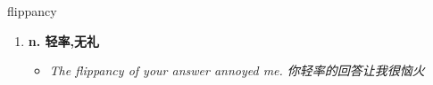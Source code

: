
\begin{frame}
{\huge flippancy}
\begin{center}
\begin{enumerate}\Large
  \item \textbf{n. 轻率,无礼}
  \begin{itemize}
    \item \em{\Large{The flippancy of your answer annoyed me. 你轻率的回答让我很恼火}}
  \end{itemize}
\end{enumerate}
\end{center}
\end{frame}
